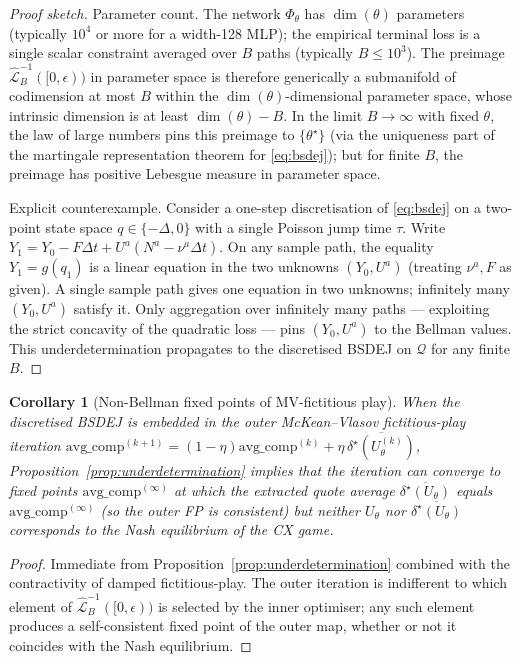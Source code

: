 \documentclass[11pt,a4paper]{article}
\newtheorem{corollary}[theorem]{Corollary}
\theoremstyle{definition}
\theoremstyle{remark}
\begin{document}
\begin{proof}[Proof sketch]
Parameter count.  The network $\Phi_\theta$ has $\dim(\theta)$
parameters (typically $10^4$ or more for a width-128 MLP);
the empirical terminal loss is a single scalar constraint
averaged over $B$ paths (typically $B \leq 10^3$).  The preimage
$\widehat{\mathcal{L}}_B^{-1}([0, \epsilon))$ in parameter space
is therefore generically a submanifold of codimension at most
$B$ within the $\dim(\theta)$-dimensional parameter space, whose
intrinsic dimension is at least $\dim(\theta) - B$.  In the
limit $B \to \infty$ with fixed $\theta$, the law of large
numbers pins this preimage to $\{\theta^\star\}$ (via the
uniqueness part of the martingale representation theorem for
\eqref{eq:bsdej}); but for finite $B$, the preimage has positive
Lebesgue measure in parameter space.

Explicit counterexample.  Consider a one-step discretisation of
\eqref{eq:bsdej} on a two-point state space
$q \in \{-\Delta, 0\}$ with a single Poisson jump time $\tau$.
Write $Y_1 = Y_0 - F \Delta t + U^a(N^a - \nu^a \Delta t)$.
On any sample path, the equality
$Y_1 = g(q_1)$ is a linear equation in the two unknowns
$(Y_0, U^a)$ (treating $\nu^a, F$ as given).  A single sample
path gives one equation in two unknowns; infinitely many
$(Y_0, U^a)$ satisfy it.  Only aggregation over infinitely many
paths --- exploiting the strict concavity of the quadratic
loss --- pins $(Y_0, U^a)$ to the Bellman values.  This
underdetermination propagates to the discretised BSDEJ on
$\mathcal{Q}$ for any finite $B$.
\end{proof}

\begin{corollary}[Non-Bellman fixed points of MV-fictitious play]\label{cor:nonbellman-fp}
When the discretised BSDEJ is embedded in the outer McKean--Vlasov
fictitious-play iteration
$\mathrm{avg\_comp}^{(k+1)} = (1 - \eta) \mathrm{avg\_comp}^{(k)} + \eta \, \overline{\delta^\star(U_\theta^{(k)})}$,
Proposition~\ref{prop:underdetermination} implies that the
iteration can converge to fixed points
$\mathrm{avg\_comp}^{(\infty)}$ at which the extracted quote
average $\overline{\delta^\star(U_\theta)}$ equals
$\mathrm{avg\_comp}^{(\infty)}$ (so the outer FP is consistent)
but neither $U_\theta$ nor
$\overline{\delta^\star(U_\theta)}$ corresponds to the Nash
equilibrium of the CX game.
\end{corollary}

\begin{proof}
Immediate from Proposition~\ref{prop:underdetermination}
combined with the contractivity of damped
fictitious-play.  The outer iteration is indifferent to which
element of $\widehat{\mathcal{L}}_B^{-1}([0, \epsilon))$ is
selected by the inner optimiser; any such element produces a
self-consistent fixed point of the outer map, whether or not it
coincides with the Nash equilibrium.
\end{proof}
\end{document}
